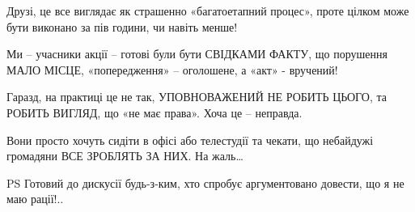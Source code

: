 Друзі, це все виглядає як страшенно «багатоетапний процес», проте цілком може
бути виконано за пів години, чи навіть менше!

Ми – учасники акції – готові були бути СВІДКАМИ ФАКТУ, що порушення МАЛО МІСЦЕ,
«попередження» – оголошене, а «акт» - вручений!

Гаразд, на практиці це не так, УПОВНОВАЖЕНИЙ НЕ РОБИТЬ ЦЬОГО, та РОБИТЬ ВИГЛЯД,
що «не має права». Хоча це – неправда. 

Вони просто хочуть сидіти в офісі або телестудії та чекати, що небайдужі
громадяни ВСЕ ЗРОБЛЯТЬ ЗА НИХ. На жаль…

PS Готовий до дискусії будь-з-ким, хто спробує аргументовано довести, що я не
маю рації!..

